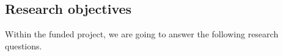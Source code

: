 





\subsection{Research objectives}







Within the funded project, we are going to answer the following research questions.


